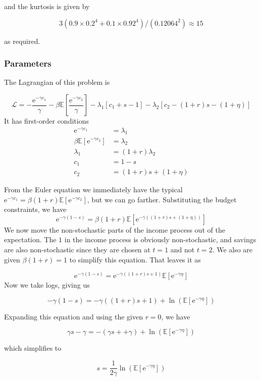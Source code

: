 \documentclass[12pt, letterpaper, parskip = full]{article}
\newcommand{\e}{\mathrm{e}}
\newcommand{\Ex}[1]{\mathbb{E}\left[#1\right]}
\begin{document}
    and the kurtosis is given by

    \[ 3 \left(0.9 \times 0.2^4 + 0.1 \times 0.92^4 \right)/(0.12064^2) \approx 15     \]

    as required.

    \subsubsection{Parameters}

    The Lagrangian of this problem is

    \[ \mathcal{L} = -\frac{\e^{-\gamma c_1}}{\gamma} - \beta \Ex{\frac{\e^{-\gamma c_2}}{\gamma}} - \lambda_1 [c_1 + s - 1] - \lambda_2 [c_2 - (1+r) s - (1 + \eta)]    \]
    It has first-order conditions
    \begin{align*}
    \e^{-\gamma c_1} &= \lambda_1 \\
    \beta \Ex{\e^{-\gamma c_2}} &= \lambda_2 \\
    \lambda_1 &= (1+r) \lambda_2 \\
    c_1 &= 1 - s \\
    c_2 &= (1+r) s + (1 + \eta)  
    \end{align*}
    
    From the Euler equation we immediately have the typical \( \e^{-\gamma c_1} = \beta (1+r) \Ex{\e^{-\gamma c_2}}  \), but we can go farther. Substituting the budget constraints, we have
    \[  \e^{-\gamma (1 - s)} = \beta (1+r) \Ex{\e^{-\gamma ((1+r) s + (1+\eta))}}   \]
    We now move the non-stochastic parts of the income process out of the expectation. The \(1\) in the income process is obviously non-stochastic, and savings are also non-stochastic since they are chosen at \(t=1\) and not \(t=2\). We also are given \(\beta(1+r) = 1\) to simplify this equation. That leaves it as 

    \[  \e^{-\gamma (1 - s)} = \e^{-\gamma ((1+r) s + 1)} \Ex{\e^{-\gamma \eta}}   \]
    Now we take logs, giving us

    \[ -\gamma (1-s) = - \gamma ((1+r) s + 1) + \ln\left(\Ex{\e^{-\gamma \eta}}\right)  \]

    Expanding this equation and using the given \(r = 0\), we have

    \[ \gamma s - \gamma = -(\gamma s + + \gamma) + \ln\left(\Ex{\e^{-\gamma \eta}}\right) \]

    which simplifies to

    \[ s = \frac{1}{2\gamma} \ln\left(\Ex{\e^{-\gamma \eta}}\right)  \]
\end{document}
